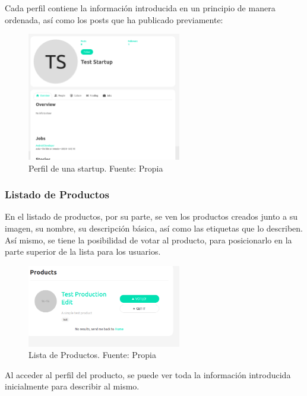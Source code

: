 Cada perfil contiene la información introducida en un principio de manera ordenada, así como los posts que ha publicado previamente:

\begin{figure}[H]
\centering
\includegraphics[width=0.60\textwidth]{img/53.png}
\caption{Perfil de una startup. Fuente: Propia}
\label{figure:startupProfileShow}
\end{figure}

\subsubsection{Listado de Productos}

En el listado de productos, por su parte, se ven los productos creados junto a su imagen, su nombre, su descripción básica, así como las etiquetas que lo describen. Así mismo, se tiene la posibilidad de votar al producto, para posicionarlo en la parte superior de la lista para los usuarios.

\begin{figure}[H]
\centering
\includegraphics[width=0.60\textwidth]{img/54.png}
\caption{
Lista de Productos. Fuente: Propia}
\label{figure:productsList}
\end{figure}

Al acceder al perfil del producto, se puede ver toda la información introducida inicialmente para describir al mismo.

